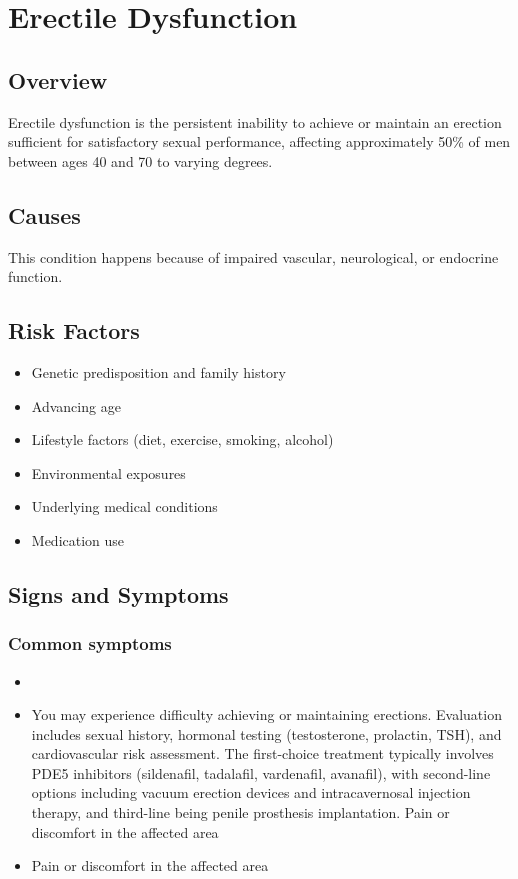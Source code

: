 \chapter{Erectile Dysfunction}
\label{sec:Erectile Dysfunction}

\section{Overview}
Erectile dysfunction is the persistent inability to achieve or maintain an erection sufficient for satisfactory sexual performance, affecting approximately 50\% of men between ages 40 and 70 to varying degrees.
\section{Causes}
This condition happens because of impaired vascular, neurological, or endocrine function.     
\section{Risk Factors}

\begin{itemize}[noitemsep]
  \item Genetic predisposition and family history
  \item Advancing age
  \item Lifestyle factors (diet, exercise, smoking, alcohol)
  \item Environmental exposures
  \item Underlying medical conditions
  \item Medication use
\end{itemize}
\section{Signs and Symptoms}

\subsection{Common symptoms}
\begin{itemize}[noitemsep]
  \item \item You may experience difficulty achieving or maintaining erections. Evaluation includes sexual history, hormonal testing (testosterone, prolactin, TSH), and cardiovascular risk assessment. The first-choice treatment typically involves PDE5 inhibitors (sildenafil, tadalafil, vardenafil, avanafil), with second-line options including vacuum erection devices and intracavernosal injection therapy, and third-line being penile prosthesis implantation. Pain or discomfort in the affected area    \item Pain or discomfort in the affected area
  \end{itemize}

